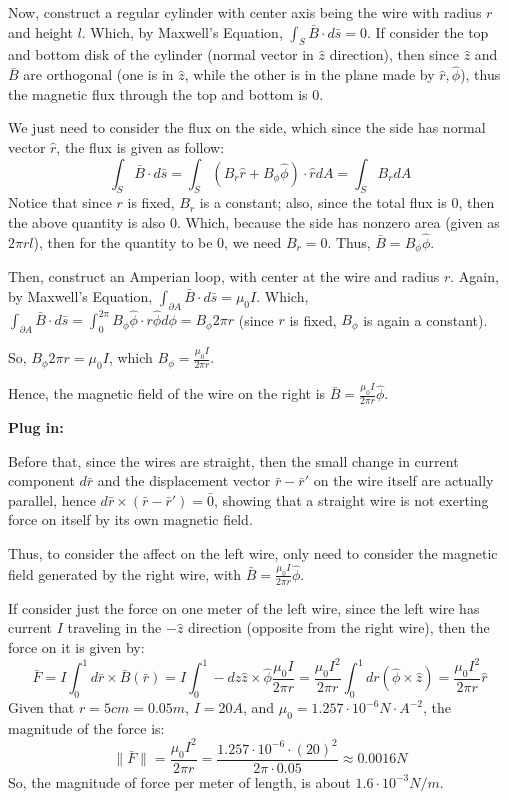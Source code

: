 \documentclass{article}
\begin{document}
\hfill

Now, construct a regular cylinder with center axis being the wire with radius $r$ and height $l$. Which, by Maxwell's Equation, $\int_S\bar{B}\cdot d\bar{s} = 0$.
If consider the top and bottom disk of the cylinder (normal vector in $\hat{z}$ direction), then since $\hat{z}$ and $\bar{B}$ are orthogonal (one is in $\hat{z}$, while the other is in the plane made by $\hat{r},\hat{\phi}$),
thus the magnetic flux through the top and bottom is $0$.

We just need to consider the flux on the side, which since the side has normal vector $\hat{r}$, the flux is given as follow:
$$\int_{S}\bar{B}\cdot d\bar{s} = \int_{S}(B_r\hat{r}+B_\phi\hat{\phi})\cdot \hat{r}dA = \int_{S}B_rdA$$
Notice that since $r$ is fixed, $B_r$ is a constant; also, since the total flux is $0$, then the above quantity is also $0$.
Which, because the side has nonzero area (given as $2\pi rl$), then for the quantity to be $0$, we need $B_r = 0$.
Thus, $\bar{B}=B_\phi\hat{\phi}$.

\hfill

Then, construct an Amperian loop, with center at the wire and radius $r$. Again, by Maxwell's Equation, $\int_{\partial A}\bar{B}\cdot d\bar{s}=\mu_0I$.
Which, $\int_{\partial A}\bar{B}\cdot d\bar{s} = \int_{0}^{2\pi}B_\phi\hat{\phi}\cdot r\hat{\phi}d\phi = B_\phi 2\pi r$ (since $r$ is fixed, $B_\phi$ is again a constant).

So, $B_\phi 2\pi r = \mu_0 I$, which $B_\phi = \frac{\mu_0I}{2\pi r}$.

Hence, the magnetic field of the wire on the right is $\bar{B}=\frac{\mu_0I}{2\pi r}\hat{\phi}$.

\hfill

\textbf{Plug in:}

Before that, since the wires are straight, then the small change in current component $d\bar{r}$ and the displacement vector $\bar{r}-\bar{r}'$ on the wire itself are actually parallel,
hence $d\bar{r}\times (\bar{r}-\bar{r}')=\bar{0}$, showing that a straight wire is not exerting force on itself by its own magnetic field.

\hfill

Thus, to consider the affect on the left wire, only need to consider the magnetic field generated by the right wire, with $\bar{B}=\frac{\mu_0I}{2\pi r}\hat{\phi}$.

If consider just the force on one meter of the left wire, since the left wire has current $I$ traveling in the $-\hat{z}$ direction (opposite from the right wire),
then the force on it is given by:
$$\bar{F}=I\int_{0}^{1}d\bar{r}\times \bar{B}(\bar{r}) = I\int_{0}^{1}-dz\hat{z}\times \hat{\phi}\frac{\mu_0I}{2\pi r} = \frac{\mu_0I^2}{2\pi r}\int_{0}^{1}dr (\hat{\phi}\times \hat{z}) = \frac{\mu_0I^2}{2\pi r}\hat{r}$$
Given that $r=5cm = 0.05m$, $I=20A$, and $\mu_0 = 1.257\cdot 10^{-6}N\cdot A^{-2}$, the magnitude of the force is:
$$\|\bar{F}\|=\frac{\mu_0I^2}{2\pi r}=\frac{1.257\cdot 10^{-6}\cdot (20)^2}{2\pi \cdot 0.05} \approx 0.0016 N$$
So, the magnitude of force per meter of length, is about $1.6 \cdot 10^{-3}N/m$.
\end{document}
